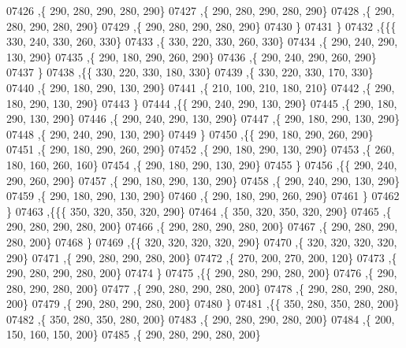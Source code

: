 \begin{DoxyCode}
07426     ,\{   290,   280,   290,   280,   290\}
07427     ,\{   290,   280,   290,   280,   290\}
07428     ,\{   290,   280,   290,   280,   290\}
07429     ,\{   290,   280,   290,   280,   290\}
07430     \}
07431    \}
07432   ,\{\{\{   330,   240,   330,   260,   330\}
07433     ,\{   330,   220,   330,   260,   330\}
07434     ,\{   290,   240,   290,   130,   290\}
07435     ,\{   290,   180,   290,   260,   290\}
07436     ,\{   290,   240,   290,   260,   290\}
07437     \}
07438    ,\{\{   330,   220,   330,   180,   330\}
07439     ,\{   330,   220,   330,   170,   330\}
07440     ,\{   290,   180,   290,   130,   290\}
07441     ,\{   210,   100,   210,   180,   210\}
07442     ,\{   290,   180,   290,   130,   290\}
07443     \}
07444    ,\{\{   290,   240,   290,   130,   290\}
07445     ,\{   290,   180,   290,   130,   290\}
07446     ,\{   290,   240,   290,   130,   290\}
07447     ,\{   290,   180,   290,   130,   290\}
07448     ,\{   290,   240,   290,   130,   290\}
07449     \}
07450    ,\{\{   290,   180,   290,   260,   290\}
07451     ,\{   290,   180,   290,   260,   290\}
07452     ,\{   290,   180,   290,   130,   290\}
07453     ,\{   260,   180,   160,   260,   160\}
07454     ,\{   290,   180,   290,   130,   290\}
07455     \}
07456    ,\{\{   290,   240,   290,   260,   290\}
07457     ,\{   290,   180,   290,   130,   290\}
07458     ,\{   290,   240,   290,   130,   290\}
07459     ,\{   290,   180,   290,   130,   290\}
07460     ,\{   290,   180,   290,   260,   290\}
07461     \}
07462    \}
07463   ,\{\{\{   350,   320,   350,   320,   290\}
07464     ,\{   350,   320,   350,   320,   290\}
07465     ,\{   290,   280,   290,   280,   200\}
07466     ,\{   290,   280,   290,   280,   200\}
07467     ,\{   290,   280,   290,   280,   200\}
07468     \}
07469    ,\{\{   320,   320,   320,   320,   290\}
07470     ,\{   320,   320,   320,   320,   290\}
07471     ,\{   290,   280,   290,   280,   200\}
07472     ,\{   270,   200,   270,   200,   120\}
07473     ,\{   290,   280,   290,   280,   200\}
07474     \}
07475    ,\{\{   290,   280,   290,   280,   200\}
07476     ,\{   290,   280,   290,   280,   200\}
07477     ,\{   290,   280,   290,   280,   200\}
07478     ,\{   290,   280,   290,   280,   200\}
07479     ,\{   290,   280,   290,   280,   200\}
07480     \}
07481    ,\{\{   350,   280,   350,   280,   200\}
07482     ,\{   350,   280,   350,   280,   200\}
07483     ,\{   290,   280,   290,   280,   200\}
07484     ,\{   200,   150,   160,   150,   200\}
07485     ,\{   290,   280,   290,   280,   200\}

\end{DoxyCode}
